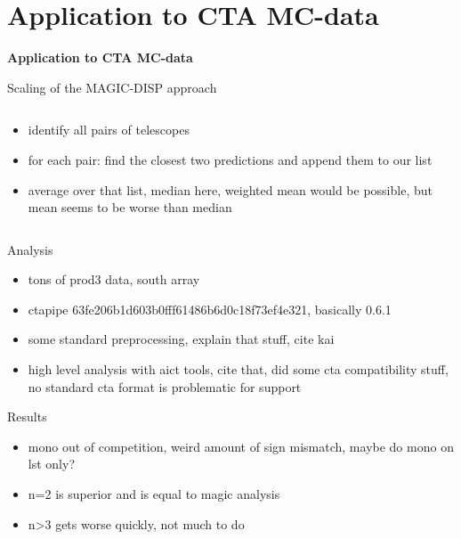 \documentclass[aspectratio=1610, 9pt]{beamer}
\begin{document}
\section{Application to CTA MC-data}
\begin{frame}
  \centering
  {\Huge \textbf{Application to CTA MC-data}}
\end{frame}

\begin{frame}{Scaling of the MAGIC-DISP approach} %
  \begin{columns}[T]
    \begin{column}{.45\textwidth}
      \begin{itemize}
        \item identify all pairs of telescopes
        \item for each pair: find the closest two predictions and append them to our list
        \item average over that list, median here, weighted mean would be possible, but mean seems to be worse than median
      \end{itemize}
    \end{column}
    \begin{column}{.45\textwidth}
    \end{column} 
  \end{columns}
\end{frame}

\begin{frame}{Analysis}
  \begin{itemize}
    \item tons of prod3 data, south array
    \item ctapipe 63fe206b1d603b0fff61486b6d0c18f73ef4e321, basically 0.6.1
    \item some standard preprocessing, explain that stuff, cite kai
    \item high level analysis with aict tools, cite that, did some cta compatibility stuff, no standard cta format is problematic for support
  \end{itemize}
\end{frame}

\begin{frame}{Results}
  \begin{itemize}
    \item mono out of competition, weird amount of sign mismatch, maybe do mono on lst only?
    \item n=2 is superior and is equal to magic analysis
    \item n>3 gets worse quickly, not much to do
  \end{itemize}
\end{frame}
\end{document}
